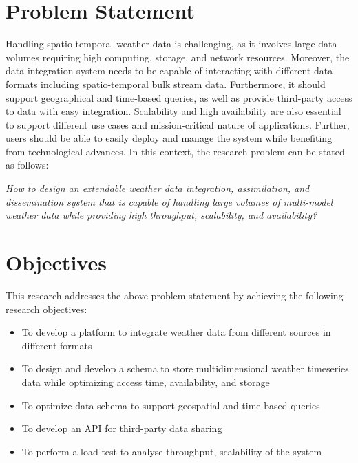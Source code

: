 \section{Problem Statement}
Handling spatio-temporal weather data is challenging, as it involves large data volumes requiring high computing, storage, and network resources. Moreover, the data integration system needs to be capable of interacting with different data formats including spatio-temporal bulk stream data. Furthermore, it should support geographical and time-based queries, as well as provide third-party access to data with easy integration. Scalability and high availability are also essential to support different use cases and mission-critical nature of applications.
Further, users should be able to easily deploy and manage the system while benefiting from technological advances. 
In this context, the research problem can be stated as follows:

\emph{How to design an extendable weather data integration, assimilation, and dissemination system that is capable of handling large volumes of multi-model weather data while providing high throughput, scalability, and availability?}

\section{Objectives}
This research addresses the above problem statement by achieving the following research objectives:
\begin{itemize}
    \item To develop a platform to integrate weather data from different sources in different formats
    \item To design and develop a schema to store multidimensional weather timeseries data while optimizing access time, availability, and storage
    \item To optimize data schema to support geospatial and time-based queries
    \item To develop an API for third-party data sharing
    \item To perform a load test to analyse throughput, scalability of the system
\end{itemize}
